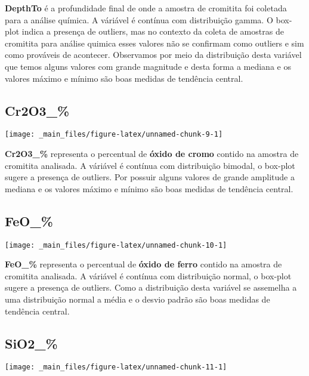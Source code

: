 \documentclass[
]{article}
\begin{document}
\textbf{DepthTo} é a profundidade final de onde a amostra de cromitita foi coletada para a análise química. A váriável é contínua com distribuição gamma. O box-plot indica a presença de outliers, mas no contexto da coleta de amostras de cromitita para análise quimica esses valores não se confirmam como outliers e sim como prováveis de acontecer. Observamos por meio da distribuição desta variável que temos alguns valores com grande magnitude e desta forma a mediana e os valores máximo e mínimo são boas medidas de tendência central.

\hypertarget{cr2o3_}{%
\subsection{Cr2O3\_\%}\label{cr2o3_}}

\begin{center}\texttt{[image: \_main\_files/figure-latex/unnamed-chunk-9-1]} \end{center}

\textbf{Cr2O3\_\%} representa o percentual de \textbf{óxido de cromo} contido na amostra de cromitita analisada. A váriável é contínua com distribuição bimodal, o box-plot sugere a presença de outliers. Por possuir alguns valores de grande amplitude a mediana e os valores máximo e mínimo são boas medidas de tendência central.

\hypertarget{feo_}{%
\subsection{FeO\_\%}\label{feo_}}

\begin{center}\texttt{[image: \_main\_files/figure-latex/unnamed-chunk-10-1]} \end{center}

\textbf{FeO\_\%} representa o percentual de \textbf{óxido de ferro} contido na amostra de cromitita analisada. A váriável é contínua com distribuição normal, o box-plot sugere a presença de outliers. Como a distribuição desta variável se assemelha a uma distribuição normal a média e o desvio padrão são boas medidas de tendência central.

\hypertarget{sio2_}{%
\subsection{SiO2\_\%}\label{sio2_}}

\begin{center}\texttt{[image: \_main\_files/figure-latex/unnamed-chunk-11-1]} \end{center}
\end{document}
